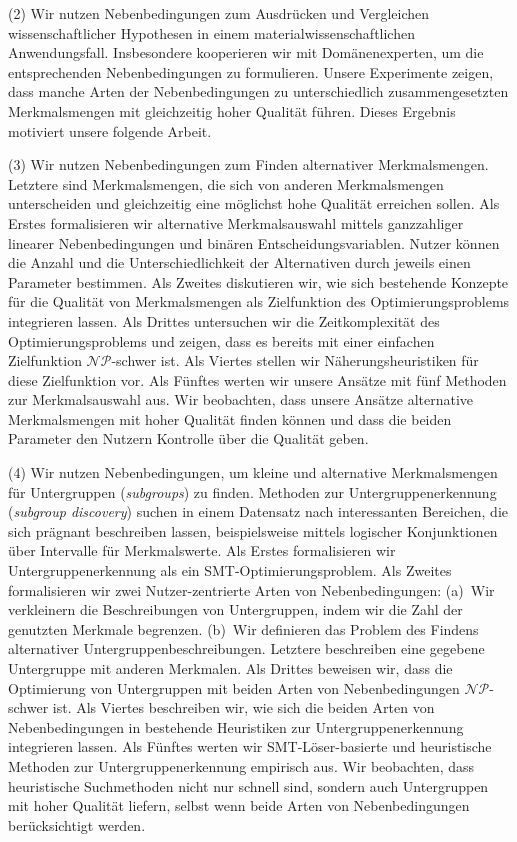 (2) Wir nutzen Nebenbedingungen zum Ausdrücken und Vergleichen wissenschaftlicher Hypothesen in einem materialwissenschaftlichen Anwendungsfall.
Insbesondere kooperieren wir mit Domänenexperten, um die entsprechenden Nebenbedingungen zu formulieren.
Unsere Experimente zeigen, dass manche Arten der Nebenbedingungen zu unterschiedlich zusammengesetzten Merkmalsmengen mit gleichzeitig hoher Qualität führen.
Dieses Ergebnis motiviert unsere folgende Arbeit.

(3) Wir nutzen Nebenbedingungen zum Finden alternativer Merkmalsmengen.
Letztere sind Merkmalsmengen, die sich von anderen Merkmalsmengen unterscheiden und gleichzeitig eine möglichst hohe Qualität erreichen sollen.
Als Erstes formalisieren wir alternative Merkmalsauswahl mittels ganzzahliger linearer Nebenbedingungen und binären Entscheidungsvariablen.
Nutzer können die Anzahl und die Unterschiedlichkeit der Alternativen durch jeweils einen Parameter bestimmen.
Als Zweites diskutieren wir, wie sich bestehende Konzepte für die Qualität von Merkmalsmengen als Zielfunktion des Optimierungsproblems integrieren lassen.
Als Drittes untersuchen wir die Zeitkomplexität des Optimierungsproblems und zeigen, dass es bereits mit einer einfachen Zielfunktion $\mathcal{NP}$-schwer ist.
Als Viertes stellen wir Näherungsheuristiken für diese Zielfunktion vor.
Als Fünftes werten wir unsere Ansätze mit fünf Methoden zur Merkmalsauswahl aus.
Wir beobachten, dass unsere Ansätze alternative Merkmalsmengen mit hoher Qualität finden können und dass die beiden Parameter den Nutzern Kontrolle über die Qualität geben.

(4) Wir nutzen Nebenbedingungen, um kleine und alternative Merkmalsmengen für Untergruppen (\emph{subgroups}) zu finden.
Methoden zur Untergruppenerkennung (\emph{subgroup discovery}) suchen in einem Datensatz nach interessanten Bereichen, die sich prägnant beschreiben lassen, beispielsweise mittels logischer Konjunktionen über Intervalle für Merkmalswerte.
Als Erstes formalisieren wir Untergruppenerkennung als ein SMT-Optimierungsproblem.
Als Zweites formalisieren wir zwei Nutzer-zentrierte Arten von Nebenbedingungen:
(a)~Wir verkleinern die Beschreibungen von Untergruppen, indem wir die Zahl der genutzten Merkmale begrenzen.
(b)~Wir definieren das Problem des Findens alternativer Untergruppenbeschreibungen.
Letztere beschreiben eine gegebene Untergruppe mit anderen Merkmalen.
Als Drittes beweisen wir, dass die Optimierung von Untergruppen mit beiden Arten von Nebenbedingungen $\mathcal{NP}$-schwer ist.
Als Viertes beschreiben wir, wie sich die beiden Arten von Nebenbedingungen in bestehende Heuristiken zur Untergruppenerkennung integrieren lassen.
Als Fünftes werten wir SMT-Löser-basierte und heuristische Methoden zur Untergruppenerkennung empirisch aus.
Wir beobachten, dass heuristische Suchmethoden nicht nur schnell sind, sondern auch Untergruppen mit hoher Qualität liefern, selbst wenn beide Arten von Nebenbedingungen berücksichtigt werden.
